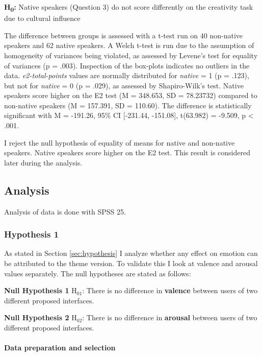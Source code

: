 		\textbf{H\textsubscript{0}:}  Native speakers (Question 3) do not score differently on the creativity task due to cultural influence 
		
		The difference between groups is assessed with a t-test run on 40 non-native speakers and 62 native speakers. A Welch t-test is run due to the assumption of homogeneity of variances being violated, as assessed by Levene's test for equality of variances (p = .003).
		Inspection of the box-plots indicates no outliers in the data. 
		\textit{e2-total-points} values are normally distributed for \textit{native} = 1 (p = .123), but not for \textit{native} = 0 (p = .029), as assessed by Shapiro-Wilk's test. 
		Native speakers score higher on the E2 test (M = 348.653, SD = 78.23732) compared to non-native speakers (M = 157.391, SD = 110.60). The difference is statistically significant with M = -191.26, 95\% CI [-231.44, -151.08], t(63.982) = -9.509, p < .001.
		
		I reject the null hypothesis of equality of means for native and non-native speakers. Native speakers score higher on the E2 test. This result is considered later during the analysis.


	\subsection{Analysis}
	
	Analysis of data is done with SPSS 25.
	
	\subsubsection{Hypothesis 1}
	
	As stated in Section \ref{sec:hypothesis} I analyze whether any effect on emotion can be attributed to the theme version. To validate this I look at valence and arousal values separately. The null hypotheses are stated as follows:
	
	\textbf{Null Hypothesis 1} H$_{01}$: There is no difference in \textbf{valence} between users of two different proposed interfaces.
	
	\textbf{Null Hypothesis 2} H$_{02}$: There is no difference in \textbf{arousal} between users of two different proposed interfaces.
	
	\paragraph{Data preparation and selection}
	
